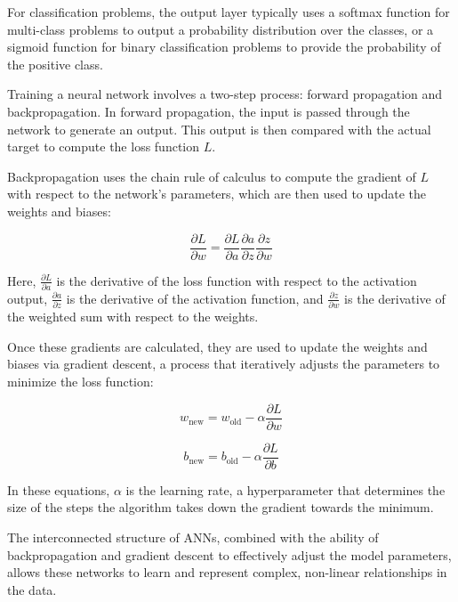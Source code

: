 For classification problems, the output layer typically uses a softmax function for multi-class problems to output a probability distribution over the classes, or a sigmoid function for binary classification problems to provide the probability of the positive class.

Training a neural network involves a two-step process: forward propagation and backpropagation. In forward propagation, the input is passed through the network to generate an output. This output is then compared with the actual target to compute the loss function $ L $.

Backpropagation uses the chain rule of calculus to compute the gradient of $ L $ with respect to the network's parameters, which are then used to update the weights and biases:

\[
\frac{\partial L}{\partial w} = \frac{\partial L}{\partial a} \frac{\partial a}{\partial z} \frac{\partial z}{\partial w}
\]

Here, $ \frac{\partial L}{\partial a} $ is the derivative of the loss function with respect to the activation output, $ \frac{\partial a}{\partial z} $ is the derivative of the activation function, and $ \frac{\partial z}{\partial w} $ is the derivative of the weighted sum with respect to the weights.

Once these gradients are calculated, they are used to update the weights and biases via gradient descent, a process that iteratively adjusts the parameters to minimize the loss function:

\[
w_{\text{new}} = w_{\text{old}} - \alpha \frac{\partial L}{\partial w}
\]

\[
b_{\text{new}} = b_{\text{old}} - \alpha \frac{\partial L}{\partial b}
\]

In these equations, $ \alpha $ is the learning rate, a hyperparameter that determines the size of the steps the algorithm takes down the gradient towards the minimum.

The interconnected structure of ANNs, combined with the ability of backpropagation and gradient descent to effectively adjust the model parameters, allows these networks to learn and represent complex, non-linear relationships in the data.
